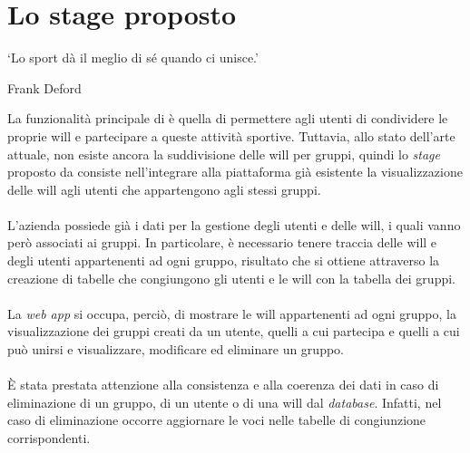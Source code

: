\section{Lo stage proposto}
\epigraph{\label{eph: sport}\enquote*{Lo sport dà il meglio di sé quando ci
            unisce.}}{Frank Deford}
\noindent La funzionalità principale di \productName è quella di permettere
agli utenti di condividere le proprie
\gls{will} e partecipare a queste attività sportive. Tuttavia, allo stato
dell'arte attuale, non esiste ancora la suddivisione
delle \gls{will}
per gruppi, quindi lo \textit{stage} proposto da \myCompany consiste
nell'integrare
alla piattaforma già esistente
la visualizzazione delle \gls{will} agli utenti che appartengono agli stessi
gruppi.\\ \\
L'azienda possiede già i dati per la gestione degli utenti e delle
\gls{will}, i quali vanno però associati ai gruppi. In particolare, è
necessario
tenere
traccia delle \gls{will} e degli utenti appartenenti ad ogni gruppo, risultato
che si ottiene attraverso
la creazione di tabelle che congiungono gli
utenti e le \gls{will} con la tabella dei gruppi.\\ \\
La \textit{web app} si occupa, perciò, di mostrare le \gls{will} appartenenti
ad ogni gruppo, la visualizzazione dei gruppi creati
da un utente, quelli a cui partecipa e quelli a cui può unirsi e visualizzare,
modificare ed eliminare un gruppo. \\ \\
È stata prestata attenzione alla consistenza e alla coerenza dei dati in caso
di eliminazione di un gruppo, di un utente o di una \gls{will} dal
\textit{database}.
Infatti, nel caso di eliminazione occorre
aggiornare le voci nelle tabelle di congiunzione corrispondenti.

